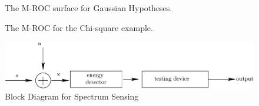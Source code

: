 \documentclass[12pt,journal,a4paper,twoside,onecolumn]{IEEEtran}
\begin{document}
\begin{spacing}{2}
\begin{figure}[!h]
           \begin{floatrow}
			 {\caption{The M-ROC surface for Gaussian Hypotheses.}
			\label{pic: LJS}
             }
			       {\caption{The M-ROC for the Chi-square example.}
              \label{pic: LJS for chisquare}
             }
           \end{floatrow}
\end{figure}

\begin{figure}[!hbp]
\centering
\includegraphics[width = \textwidth]{4/fig4.eps}
\caption{Block Diagram for Spectrum Sensing}
\label{pic: block diagram}
\end{figure}

\end{spacing}
\end{document}
